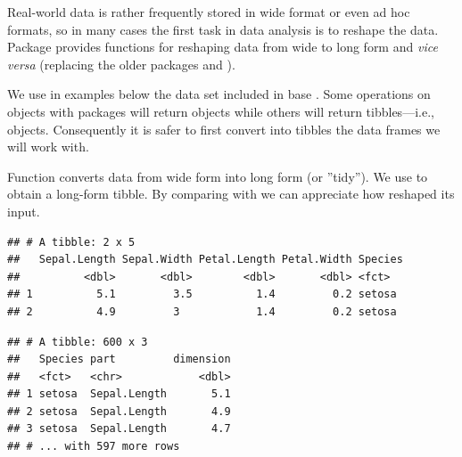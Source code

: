 \documentclass[krantz2]{krantz}\usepackage{knitr}
\begin{document}
Real-world data is rather frequently stored in wide format or even ad hoc formats, so in many cases the first task in data analysis is to reshape the data. Package  provides functions for reshaping data from wide to long form and \emph{vice versa} (replacing the older packages  and ).

We use in examples below the  data set included in base \Rlang. Some operations on \Rlang {} objects with  packages will return  objects while others will return tibbles---i.e.,  objects. Consequently it is safer to first convert into tibbles the data frames we will work with.

\begin{knitrout}\footnotesize
{}\color{fgcolor}\begin{kframe}
\begin{alltt}
 \hlkwb{<-} 
\end{alltt}
\end{kframe}
\end{knitrout}

Function  converts data from wide form into long form (or ''tidy''). We use  to obtain a long-form tibble. By comparing  with  we can appreciate how  reshaped its input.

\begin{knitrout}\footnotesize
{}\color{fgcolor}\begin{kframe}
\begin{alltt}
 \hlstd{)}
\end{alltt}
\begin{verbatim}
## # A tibble: 2 x 5
##   Sepal.Length Sepal.Width Petal.Length Petal.Width Species
##          <dbl>       <dbl>        <dbl>       <dbl> <fct>  
## 1          5.1         3.5          1.4         0.2 setosa 
## 2          4.9         3            1.4         0.2 setosa
\end{verbatim}
\begin{alltt}
  \hlstd{(} \hlstd{= _,}     \hlopt{-} \hlkwb{->} 
\end{alltt}
\begin{verbatim}
## # A tibble: 600 x 3
##   Species part         dimension
##   <fct>   <chr>            <dbl>
## 1 setosa  Sepal.Length       5.1
## 2 setosa  Sepal.Length       4.9
## 3 setosa  Sepal.Length       4.7
## # ... with 597 more rows
\end{verbatim}
\end{kframe}
\end{knitrout}
\end{document}
